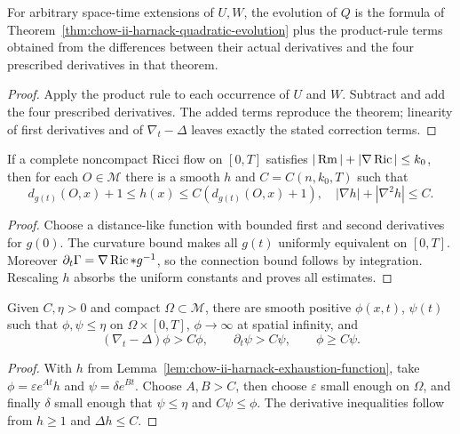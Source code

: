 \begin{example}
\label{ex:chow-ii-unconstrained-harnack-quadratic-evolution}
For arbitrary space-time extensions of \(U,W\), the evolution of \(Q\) is the
formula of Theorem~\ref{thm:chow-ii-harnack-quadratic-evolution} plus the
product-rule terms obtained from the differences between their actual
derivatives and the four prescribed derivatives in that theorem.
\end{example}
\begin{proof}
Apply the product rule to each occurrence of \(U\) and \(W\).  Subtract and
add the four prescribed derivatives.  The added terms reproduce the theorem;
linearity of first derivatives and of \(\nabla_t-\Delta\) leaves exactly the
stated correction terms.
\end{proof}

\begin{lemma}
\label{lem:chow-ii-harnack-exhaustion-function}
If a complete noncompact Ricci flow on \([0,T]\) satisfies
\(|\operatorname{Rm}|+|\nabla\operatorname{Ric}|\le k_0\), then for each \(O\in\mathcal M\) there is a
smooth \(h\) and \(C=C(n,k_0,T)\) such that
\[
d_{g(t)}(O,x)+1\le h(x)\le C(d_{g(t)}(O,x)+1),
\quad |\nabla h|+|\nabla^2h|\le C.
\]
\end{lemma}
\begin{proof}
Choose a distance-like function with bounded first and second derivatives for
\(g(0)\).  The curvature bound makes all \(g(t)\) uniformly equivalent on
\([0,T]\).  Moreover \(\partial_t\Gamma=\nabla\operatorname{Ric}* g^{-1}\), so the
connection bound follows by integration.  Rescaling \(h\) absorbs the uniform
constants and proves all estimates.
\end{proof}

\begin{lemma}
\label{lem:chow-ii-harnack-barrier-functions}
Given \(C,\eta>0\) and compact \(\Omega\subset\mathcal M\), there are smooth
positive \(\phi(x,t)\), \(\psi(t)\) such that \(\phi,\psi\le\eta\) on
\(\Omega\times[0,T]\), \(\phi\to\infty\) at spatial infinity, and
\[
(\nabla_t-\Delta)\phi>C\phi,\qquad \partial_t\psi>C\psi,
\qquad \phi\ge C\psi.
\]
\end{lemma}
\begin{proof}
With \(h\) from Lemma~\ref{lem:chow-ii-harnack-exhaustion-function}, take
\(\phi=\varepsilon e^{At}h\) and \(\psi=\delta e^{Bt}\).  Choose
\(A,B>C\), then choose \(\varepsilon\) small enough on \(\Omega\), and
finally \(\delta\) small enough that \(\psi\le\eta\) and
\(C\psi\le\phi\).  The derivative inequalities follow from
\(h\ge1\) and \(\Delta h\le C\).
\end{proof}

